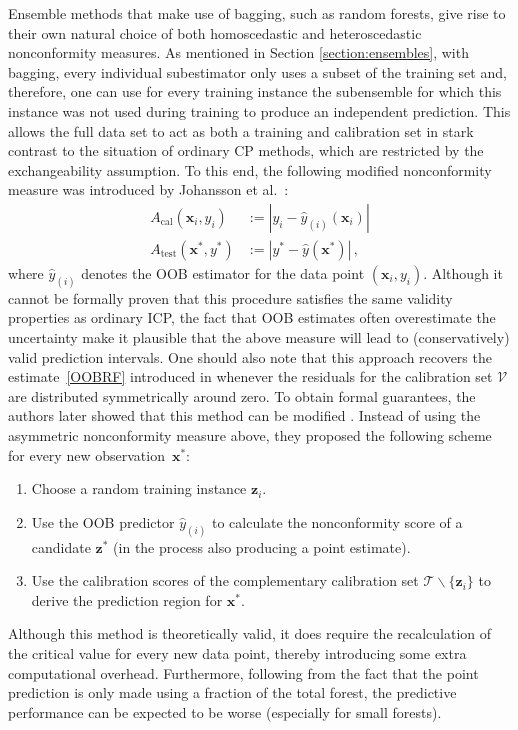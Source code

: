 \documentclass[smallcondensed]{svjour3}
\begin{document}
    Ensemble methods that make use of bagging, such as random forests, give rise to their own natural choice of both homoscedastic and heteroscedastic nonconformity measures. As mentioned in Section \ref{section:ensembles}, with bagging, every individual subestimator only uses a subset of the training set and, therefore, one can use for every training instance the subensemble for which this instance was not used during training to produce an independent prediction. This allows the full data set to act as both a training and calibration set in stark contrast to the situation of ordinary CP methods, which are restricted by the exchangeability assumption. To this end, the following modified nonconformity measure was introduced by Johansson et al.~\cite{johansson2014regression}:
    \begin{align}
        A_\text{cal}(\mathbf{x}_i,y_i) &:= |y_i-\hat{y}_{(i)}(\mathbf{x}_i)|\\
        A_\text{test}(\mathbf{x}^*,y^*) &:= |y^*-\hat{y}(\mathbf{x}^*)|\,,
    \end{align}
    where $\hat{y}_{(i)}$ denotes the OOB estimator for the data point $(\mathbf{x}_i,y_i)$. Although it cannot be formally proven that this procedure satisfies the same validity properties as ordinary ICP, the fact that OOB estimates often overestimate the uncertainty make it plausible that the above measure will lead to (conservatively) valid prediction intervals. One should also note that this approach recovers the estimate~\eqref{OOBRF} introduced in \cite{oob_rf} whenever the residuals for the calibration set $\mathcal{V}$ are distributed symmetrically around zero. To obtain formal guarantees, the authors later showed that this method can be modified \cite{bostrom2017accelerating}. Instead of using the asymmetric nonconformity measure above, they proposed the following scheme for every new observation~$\mathbf{x}^*$:
    \begin{enumerate}
        \item Choose a random training instance $\mathbf{z}_i$.
        \item Use the OOB predictor $\hat{y}_{(i)}$ to calculate the nonconformity score of a candidate $\mathbf{z}^*$ (in the process also producing a point estimate).
        \item Use the calibration scores of the complementary calibration set $\mathcal{T}\backslash\{\mathbf{z}_i\}$ to derive the prediction region for $\mathbf{x}^*$.
    \end{enumerate}
    Although this method is theoretically valid, it does require the recalculation of the critical value for every new data point, thereby introducing some extra computational overhead. Furthermore, following from the fact that the point prediction is only made using a fraction of the total forest, the predictive performance can be expected to be worse (especially for small forests).
\end{document}
